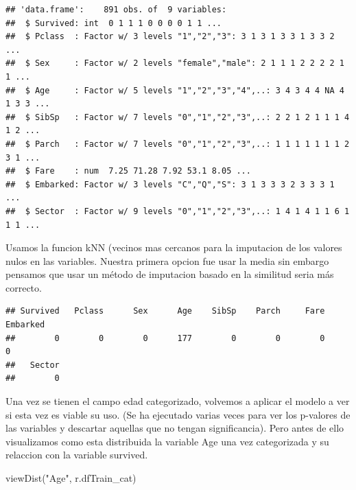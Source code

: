 \documentclass[
]{article}
\newenvironment{Shaded}{\begin{snugshade}}{\end{snugshade}}
\newcommand{\KeywordTok}[1]{\textcolor[rgb]{0.94,0.87,0.69}{#1}}
\newcommand{\NormalTok}[1]{\textcolor[rgb]{0.80,0.80,0.80}{#1}}
\newcommand{\OperatorTok}[1]{\textcolor[rgb]{0.94,0.94,0.82}{#1}}
\newcommand{\StringTok}[1]{\textcolor[rgb]{0.80,0.58,0.58}{#1}}
\begin{document}
\begin{verbatim}
## 'data.frame':    891 obs. of  9 variables:
##  $ Survived: int  0 1 1 1 0 0 0 0 1 1 ...
##  $ Pclass  : Factor w/ 3 levels "1","2","3": 3 1 3 1 3 3 1 3 3 2 ...
##  $ Sex     : Factor w/ 2 levels "female","male": 2 1 1 1 2 2 2 2 1 1 ...
##  $ Age     : Factor w/ 5 levels "1","2","3","4",..: 3 4 3 4 4 NA 4 1 3 3 ...
##  $ SibSp   : Factor w/ 7 levels "0","1","2","3",..: 2 2 1 2 1 1 1 4 1 2 ...
##  $ Parch   : Factor w/ 7 levels "0","1","2","3",..: 1 1 1 1 1 1 1 2 3 1 ...
##  $ Fare    : num  7.25 71.28 7.92 53.1 8.05 ...
##  $ Embarked: Factor w/ 3 levels "C","Q","S": 3 1 3 3 3 2 3 3 3 1 ...
##  $ Sector  : Factor w/ 9 levels "0","1","2","3",..: 1 4 1 4 1 1 6 1 1 1 ...
\end{verbatim}

Usamos la funcion kNN (vecinos mas cercanos para la imputacion de los
valores nulos en las variables. Nuestra primera opcion fue usar la media
sin embargo pensamos que usar un método de imputacion basado en la
similitud seria más correcto.

\begin{Shaded}
\end{Shaded}

\begin{verbatim}
## Survived   Pclass      Sex      Age    SibSp    Parch     Fare Embarked 
##        0        0        0      177        0        0        0        0 
##   Sector 
##        0
\end{verbatim}

Una vez se tienen el campo edad categorizado, volvemos a aplicar el
modelo a ver si esta vez es viable su uso. (Se ha ejecutado varias veces
para ver los p-valores de las variables y descartar aquellas que no
tengan significancia). Pero antes de ello visualizamos como esta
distribuida la variable Age una vez categorizada y su relaccion con la
variable survived.

\begin{Shaded}
\begin{Highlighting}[]
\NormalTok{viewDist(}\StringTok{"Age"}\NormalTok{, r.dfTrain_cat)}
\end{Highlighting}
\end{Shaded}
\end{document}

